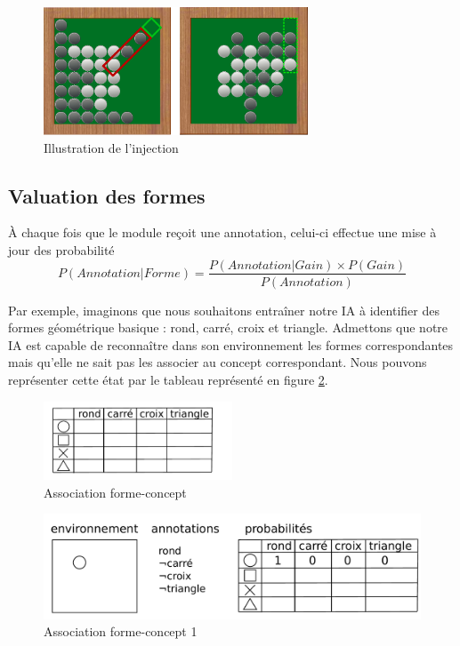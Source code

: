 \begin{figure}[H] 
\begin{center}
\includegraphics[width=0.7\textwidth]{files/raisonneur/cbs_reco3} 
\end{center}
\caption{Illustration de l'injection} 
\label{img_cbs_reco3}
\end{figure}

\subsection{Valuation des formes}

À chaque fois que le module reçoit une annotation, celui-ci effectue une mise à jour des probabilité
\[ P(Annotation|Forme) = \frac{P(Annotation|Gain) \times P(Gain)}{P(Annotation)} \]

Par exemple, imaginons que nous souhaitons entraîner notre IA à identifier des formes géométrique basique : rond, carré, croix et triangle. Admettons que notre IA est capable de reconnaître dans son environnement les formes correspondantes mais qu'elle ne sait pas les associer au concept correspondant. Nous pouvons représenter cette état par le tableau représenté en figure \ref{img_annotations}.

\begin{figure}[H] 
  \begin{center}
    \includegraphics[width=0.5\textwidth]{files/raisonneur/annotations} 
  \end{center}
\caption{Association forme-concept} 
\label{img_annotations}
\end{figure}

\begin{figure}[H] 
\includegraphics[width=\textwidth]{files/raisonneur/annotations_1} 
\caption{Association forme-concept 1} 
\label{img_annotations_1}
\end{figure}

